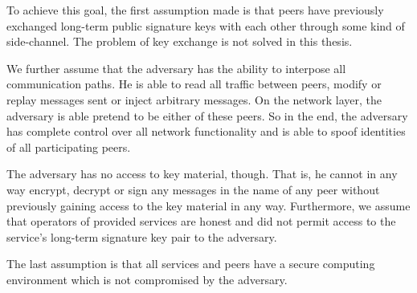 To achieve this goal, the first assumption made is that peers have previously exchanged long-term public signature keys with each other through some kind of side-channel.
The problem of key exchange is not solved in this thesis.

We further assume that the adversary has the ability to interpose all communication paths.
He is able to read all traffic between peers, modify or replay messages sent or inject arbitrary messages.
On the network layer, the adversary is able pretend to be either of these peers.
So in the end, the adversary has complete control over all network functionality and is able to spoof identities of all participating peers.

The adversary has no access to key material, though.
That is, he cannot in any way encrypt, decrypt or sign any messages in the name of any peer without previously gaining access to the key material in any way.
Furthermore, we assume that operators of provided services are honest and did not permit access to the service's long-term signature key pair to the adversary.

The last assumption is that all services and peers have a secure computing environment which is not compromised by the adversary.

